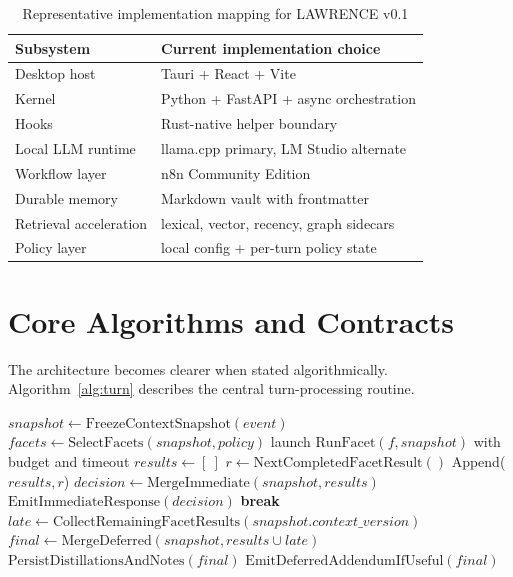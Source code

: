 \documentclass[conference]{IEEEtran}
\begin{document}
\begin{table}[t]
\caption{Representative implementation mapping for LAWRENCE v0.1}
\label{tab:implmap}
\centering
\begin{tabular}{p{} p{}}
\toprule
\textbf{Subsystem} & \textbf{Current implementation choice} \\
\midrule
Desktop host & Tauri + React + Vite \\
Kernel & Python + FastAPI + async orchestration \\
Hooks & Rust-native helper boundary \\
Local LLM runtime & llama.cpp primary, LM Studio alternate \\
Workflow layer & n8n Community Edition \\
Durable memory & Markdown vault with frontmatter \\
Retrieval acceleration & lexical, vector, recency, graph sidecars \\
Policy layer & local config + per-turn policy state \\
\bottomrule
\end{tabular}
\end{table}

\section{Core Algorithms and Contracts}
The architecture becomes clearer when stated algorithmically. Algorithm~\ref{alg:turn} describes the central turn-processing routine.

\begin{algorithm}[t]
\caption{Parallel turn processing in LAWRENCE}
\label{alg:turn}
\begin{algorithmic}[1]
\State $snapshot \gets \mathrm{FreezeContextSnapshot}(event)$
\State $facets \gets \mathrm{SelectFacets}(snapshot, policy)$
\State launch $\mathrm{RunFacet}(f, snapshot)$ with budget and timeout
\EndFor
\State $results \gets [\ ]$
\State $r \gets \mathrm{NextCompletedFacetResult}()$
\State Append($results, r$)
\EndIf
{}
\State $decision \gets \mathrm{MergeImmediate}(snapshot, results)$
\State $\mathrm{EmitImmediateResponse}(decision)$
\State \textbf{break}
\EndIf
\EndWhile
\State $late \gets \mathrm{CollectRemainingFacetResults}(snapshot.context\_version)$
\State $final \gets \mathrm{MergeDeferred}(snapshot, results \cup late)$
\State $\mathrm{PersistDistillationsAndNotes}(final)$
\State $\mathrm{EmitDeferredAddendumIfUseful}(final)$
\EndProcedure
\end{algorithmic}
\end{algorithm}
\end{document}
